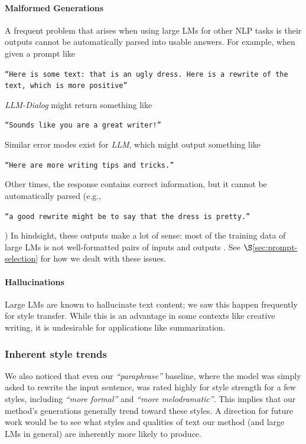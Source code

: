 \paragraph{Malformed Generations} A frequent problem that arises when using large LMs for other NLP tasks is their outputs cannot be automatically parsed into usable answers. For example, when given a prompt like \begin{small}
 \texttt{``Here is some text: {that is an ugly dress}. Here is a rewrite of the text, which is more positive''} \end{small}
 \textit{LLM-Dialog} might return something like \begin{small}
 \texttt{``Sounds like you are a great writer!''} \end{small} Similar error modes exist for \textit{LLM}, which might output something like \begin{small}
 \texttt{``Here are more writing tips and tricks.''} \end{small} Other times, the response contains correct information, but it cannot be automatically parsed (e.g., \begin{small}
 \texttt{``a good rewrite might be to say that the dress is pretty.''} \end{small}) In hindsight, these outputs make a lot of sense: most of the training data of large LMs is not well-formatted pairs of inputs and outputs  \citep{reynolds2021prompt}. See $\S$\ref{sec:prompt-selection} for how we dealt with these issues.

\paragraph{Hallucinations} Large LMs are known to hallucinate text content; we saw this happen frequently for style transfer. While this is an advantage in some contexts like creative writing, it is undesirable for applications like summarization. 
\subsubsection{Inherent style trends} We also noticed that even our \textit{``paraphrase''} baseline, where the model was simply asked to rewrite the input sentence, was rated highly for style strength for a few styles, including \textit{``more formal''} and \textit{``more melodramatic''}.
This implies that our method's generations generally trend toward these styles.
A direction for future work would be to see what styles and qualities of text our method (and large LMs in general) are inherently more likely to produce.

